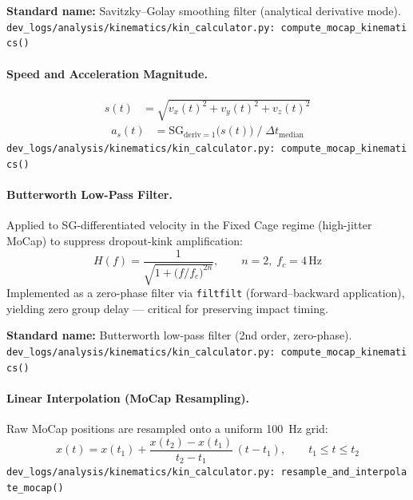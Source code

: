 \textbf{Standard name:} Savitzky--Golay smoothing filter (analytical derivative mode).\\
\texttt{\small dev\_logs/analysis/kinematics/kin\_calculator.py:\ compute\_mocap\_kinematics()}

\medskip
\paragraph{Speed and Acceleration Magnitude.}
\begin{align}
    s(t) &= \sqrt{v_x(t)^2 + v_y(t)^2 + v_z(t)^2}
\end{align}
\begin{align}
    a_s(t) &= \mathrm{SG}_{\text{deriv}=1}\bigl(s(t)\bigr) \;/\; \Delta t_{\text{median}} \nonumber
\end{align}
\texttt{\small dev\_logs/analysis/kinematics/kin\_calculator.py:\ compute\_mocap\_kinematics()}

\medskip
\paragraph{Butterworth Low-Pass Filter.}
Applied to SG-differentiated velocity in the Fixed Cage regime (high-jitter MoCap) to suppress dropout-kink amplification:
\begin{equation}
    H(f) = \frac{1}{\sqrt{1 + \bigl(f / f_c\bigr)^{2n}}},\qquad n = 2,\; f_c = 4\,\mathrm{Hz}
\end{equation}
Implemented as a zero-phase filter via \texttt{filtfilt} (forward--backward application), yielding zero group delay --- critical for preserving impact timing.

\textbf{Standard name:} Butterworth low-pass filter (2nd order, zero-phase).\\
\texttt{\small dev\_logs/analysis/kinematics/kin\_calculator.py:\ compute\_mocap\_kinematics()}

\medskip
\paragraph{Linear Interpolation (MoCap Resampling).}
Raw MoCap positions are resampled onto a uniform 100~Hz grid:
\begin{equation}
    \hat{x}(t) = x(t_1) + \frac{x(t_2) - x(t_1)}{t_2 - t_1}\,(t - t_1),\qquad t_1 \le t \le t_2
\end{equation}
\texttt{\small dev\_logs/analysis/kinematics/kin\_calculator.py:\ resample\_and\_interpolate\_mocap()}

